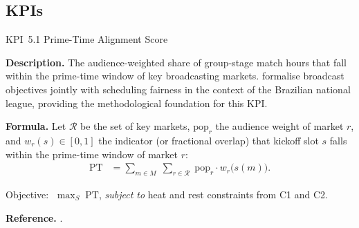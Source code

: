 \documentclass[12pt, letterpaper]{article}
\newcommand{\kpilabel}[1]{\noindent\textbf{#1}\enspace}
\begin{document}
\subsection{KPIs}

\begin{kpibox}{KPI~5.1 \textendash{} Prime-Time Alignment Score}

\kpilabel{Description.}
The audience-weighted share of group-stage match hours that fall within
the prime-time window of key broadcasting markets.
\citet{RibeiroUrrutia2007} formalise broadcast objectives jointly with
scheduling fairness in the context of the Brazilian national league,
providing the methodological foundation for this KPI.

\medskip
\kpilabel{Formula.}
Let $\mathcal{R}$ be the set of key markets, $\mathrm{pop}_r$ the
audience weight of market $r$, and $w_r(s) \in [0,1]$ the indicator
(or fractional overlap) that kickoff slot $s$ falls within the
prime-time window of market $r$:
\begin{align*}
  \mathrm{PT} &= \sum_{m \in M}\;\sum_{r \in \mathcal{R}}\;
    \mathrm{pop}_r \cdot w_r\!\bigl(s(m)\bigr).
\end{align*}
\vspace{-8pt}

\noindent
Objective: $\;\displaystyle\max_{S}\;\mathrm{PT}$,
\emph{subject to} heat and rest constraints from C1 and C2.

\medskip
\kpilabel{Reference.}
\citet{RibeiroUrrutia2007}.
\end{kpibox}
\end{document}
